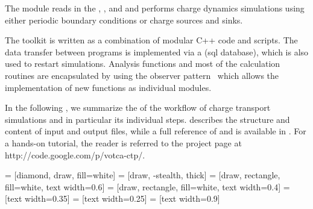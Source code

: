 The   module reads in the , , and  and performs charge dynamics simulations using either periodic boundary conditions or charge sources and sinks. 

The toolkit is written as a combination of modular C++ code and scripts. The data transfer between programs is implemented via a  (sql database), which is also used to restart simulations. Analysis functions and most of the calculation routines are encapsulated by using the observer pattern~\cite{gamma_design_1995} which allows the implementation of new functions as individual modules.

In the following , we summarize the  of the workflow of charge transport simulations and in particular its individual steps.  describes the structure and content of input and output files, while a full reference of  and  is available in . For a hands-on tutorial, the reader is referred to the \hyperref[http://code.google.com/p/votca-ctp/]{\votcactp} project page at http://code.google.com/p/votca-ctp/.



 = [diamond, draw, fill=white]
 = [draw, -stealth, thick]
 = [draw, rectangle, fill=white, text width=0.6\linewidth]
 = [draw, rectangle, fill=white, text width=0.4\linewidth]
 = [text width=0.35\linewidth]
 = [text width=0.25\linewidth]
 = [text width=0.9\linewidth]

